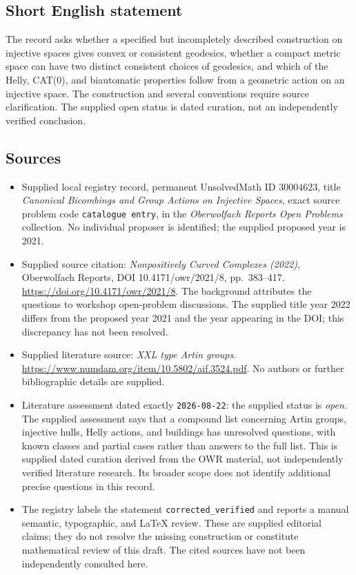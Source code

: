 \documentclass[11pt]{article}
\begin{document}
\subsection{Short English statement}
The record asks whether a specified but incompletely described construction on injective spaces gives convex or consistent geodesics, whether a compact metric space can have two distinct consistent choices of geodesics, and which of the Helly, CAT(0), and biautomatic properties follow from a geometric action on an injective space. The construction and several conventions require source clarification. The supplied open status is dated curation, not an independently verified conclusion.
\subsection{Sources}
\begin{itemize}
\item Supplied local registry record, permanent UnsolvedMath ID \(30004623\), title \emph{Canonical Bicombings and Group Actions on Injective Spaces}, exact source problem code \texttt{catalogue entry}, in the \emph{Oberwolfach Reports Open Problems} collection. No individual proposer is identified; the supplied proposed year is 2021.
\item Supplied source citation: \emph{Nonpositively Curved Complexes (2022)}, Oberwolfach Reports, DOI 10.4171/owr/2021/8, pp.\ 383--417. \url{https://doi.org/10.4171/owr/2021/8}. The background attributes the questions to workshop open-problem discussions. The supplied title year 2022 differs from the proposed year 2021 and the year appearing in the DOI; this discrepancy has not been resolved.
\item Supplied literature source: \emph{XXL type Artin groups}. \url{https://www.numdam.org/item/10.5802/aif.3524.pdf}. No authors or further bibliographic details are supplied.
\item Literature assessment dated exactly \texttt{2026-08-22}: the supplied status is \emph{open}. The supplied assessment says that a compound list concerning Artin groups, injective hulls, Helly actions, and buildings has unresolved questions, with known classes and partial cases rather than answers to the full list. This is supplied dated curation derived from the OWR material, not independently verified literature research. Its broader scope does not identify additional precise questions in this record.
\item The registry labels the statement \texttt{corrected\_verified} and reports a manual semantic, typographic, and LaTeX review. These are supplied editorial claims; they do not resolve the missing construction or constitute mathematical review of this draft. The cited sources have not been independently consulted here.
\end{itemize}
\end{document}
